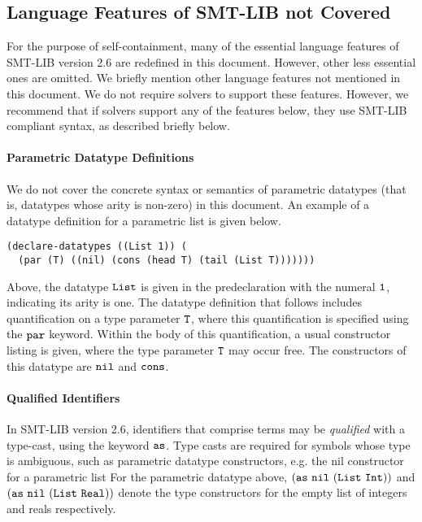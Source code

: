 \documentclass[english,a4paper,10pt]{article}
\begin{document}
\begin{appendix}
\section{Language Features of SMT-LIB not Covered}%
\label{apx:not-covered}

For the purpose of self-containment,
many of the essential language features of SMT-LIB version 2.6
are redefined in this document.
However, other less essential ones are omitted.
We briefly mention other language features not mentioned in
this document.
We do not require solvers to support these features.
However, we recommend that if solvers support any of the features below,
they use SMT-LIB compliant syntax, as described briefly below.

\paragraph{Parametric Datatype Definitions}
We do not cover the concrete syntax or semantics of parametric datatypes (that
is, datatypes whose arity is non-zero) in this document.
An example of a datatype definition for a parametric list is given below.
\begin{lstlisting}
(declare-datatypes ((List 1)) (
  (par (T) ((nil) (cons (head T) (tail (List T)))))))
\end{lstlisting}
Above, the datatype ${\tt List}$ 
is given in the predeclaration with the numeral ${\tt 1}$, indicating
its arity is one.
The datatype definition that follows includes quantification on a type
parameter ${\tt T}$, where this quantification is specified using the 
${\tt par}$ keyword. Within the body of this quantification,
a usual constructor listing is given, where the type parameter ${\tt T}$
may occur free. The constructors of this datatype are ${\tt nil}$
and ${\tt cons}$.

\paragraph{Qualified Identifiers}
In SMT-LIB version 2.6,
identifiers that comprise terms
may be \emph{qualified} with a type-cast, using the keyword $\texttt{as}$.
Type casts are required for symbols whose type is ambiguous,
such as parametric datatype constructors, e.g. the nil constructor
for a parametric list
For the parametric datatype above, 
${\tt (as\ nil\ (List\ Int))}$ and ${\tt (as\ nil\ (List\ Real))}$ 
denote the type constructors
for the empty list of integers and reals respectively.


\end{appendix}
\end{document}
